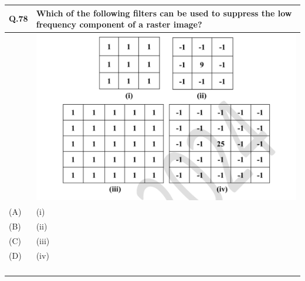 \documentclass[12pt]{article}
\begin{document}
\begin{table}[H]
\renewcommand{\arraystretch}{3}
\setlength{\tabcolsep}{8pt}
\begin{tabular}{|l|p{15cm}|}
\hline

Q.78 &Which of the following filters can be used to suppress the low frequency component
of a raster image?\\ \hline
    & \includegraphics[scale = 0.7]{LatexImage11.png}\\ \hline
(A)&(i)\\ \hline
(B)&(ii)\\ \hline
(C)&(iii)\\ \hline
(D)&(iv)\\ \hline
& \\ 
& \\ 
& \\ 
& \\ \hline

\end{tabular}
\end{table} 
\newpage
\end{document}

